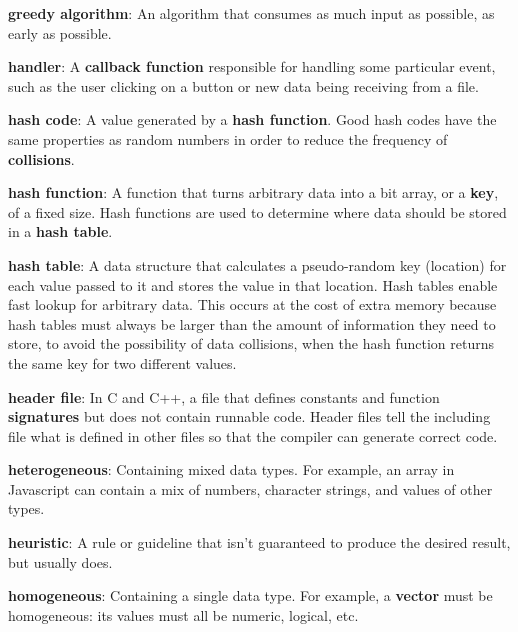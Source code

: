\documentclass[krantzl]{krantz}
\newcommand{\glosskey}[1]{\textbf{#1}}
\begin{document}
\noindent \textbf{{\newline}\glosskey{greedy algorithm}}: 
An algorithm that consumes as much input as possible, as early as possible.


\noindent \textbf{{\newline}\glosskey{handler}}: 
A \glosskey{callback function} responsible for handling some particular event, such as the user clicking on a button or new data being receiving from a file.


\noindent \textbf{{\newline}\glosskey{hash code}}: 
A value generated by a \glosskey{hash function}. Good hash codes have the same properties as random numbers in order to reduce the frequency of \glosskey{collisions}.


\noindent \textbf{{\newline}\glosskey{hash function}}: 
A function that turns arbitrary data into a bit array, or a \glosskey{key}, of a fixed size. Hash functions are used to determine where data should be stored in a \glosskey{hash table}.


\noindent \textbf{{\newline}\glosskey{hash table}}: 
A data structure that calculates a pseudo-random key (location) for each value passed to it and stores the value in that location. Hash tables enable fast lookup for arbitrary data. This occurs at the cost of extra memory because hash tables must always be larger than the amount of information they need to store, to avoid the possibility of data collisions, when the hash function returns the same key for two different values.


\noindent \textbf{{\newline}\glosskey{header file}}: 
In C and C++, a file that defines constants and function \glosskey{signatures} but does not contain runnable code. Header files tell the including file what is defined in other files so that the compiler can generate correct code.


\noindent \textbf{{\newline}\glosskey{heterogeneous}}: 
Containing mixed data types. For example, an array in Javascript can contain a mix of numbers, character strings, and values of other types.


\noindent \textbf{{\newline}\glosskey{heuristic}}: 
A rule or guideline that isn’t guaranteed to produce the desired result, but usually does.


\noindent \textbf{{\newline}\glosskey{homogeneous}}: 
Containing a single data type. For example, a \glosskey{vector} must be homogeneous: its values must all be numeric, logical, etc.
\end{document}
